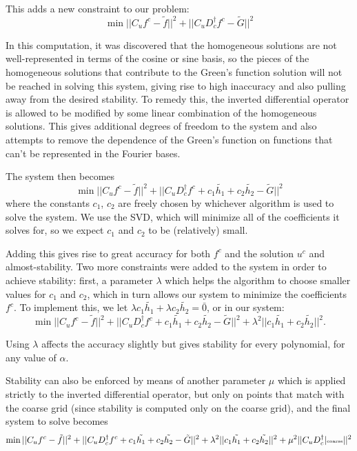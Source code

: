 \documentclass[11pt]{amsart}
\begin{document}
This adds a new constraint to our problem: 
\begin{equation}
\min ||C_u f^c - \tilde{f}|| ^2 + ||C_u D_c^{\dagger} f^c - \tilde{G}||^2
\end{equation} 

In this computation, it was discovered that the homogeneous solutions are not well-represented in terms of the cosine or sine basis, so the pieces of the homogeneous solutions that contribute to the Green's function solution will not be reached in solving this system, giving rise to high inaccuracy and also pulling away from the desired stability. To remedy this, the inverted differential operator is allowed to be modified by some linear combination of the homogeneous solutions.  This gives additional degrees of freedom to the system and also attempts to remove the dependence of the Green's function on functions that can't be represented in the Fourier bases.  

The system then becomes
\begin{equation}
\min ||C_u f^c - \tilde{f}|| ^2 + ||C_u D_c^{\dagger} f^c +c_1 \tilde{h_1} + c_2 \tilde{h_2} - \tilde{G}||^2
\end{equation}
where the constants $c_1$, $c_2$ are freely chosen by whichever algorithm is used to solve the system.  We use the SVD, which will minimize all of the coefficients it solves for, so we expect $c_1$ and $c_2$ to be (relatively) small.  


Adding this gives rise to great accuracy for both $f^c$ and the solution $u^c$ and almost-stability.  Two more constraints were added to the system in order to achieve stability: first, a parameter $\lambda$ which helps the algorithm to choose smaller values for $c_1$ and $c_2$,  which in turn allows our system to minimize the coefficients $f^c$. To implement this, we let $\lambda c_1 \tilde{h_1} + \lambda c_2 \tilde{h_2} = \bar{0}$, or in our system:
\begin{equation}
\min ||C_u f^c - \tilde{f}|| ^2 + ||C_u D_c^{\dagger} f^c +c_1\tilde{h_1}+c_2\tilde{h_2}- \tilde{G}||^2 + \lambda^2|| c_1 \tilde{h_1} + c_2 \tilde{h_2} ||^2.
\end{equation}

Using $\lambda$ affects the accuracy slightly but gives stability for every polynomial, for any value of $\alpha$.  

Stability can also be enforced by means of another parameter $\mu$ which is applied strictly to the inverted differential operator, but only on points that match with the coarse grid (since stability is computed only on the coarse grid), and the final system to solve becomes
\begin{equation}
\min ||C_u f^c - \tilde{f}|| ^2 + ||C_u D_c^{\dagger} f^c +c_1\tilde{h_1}+c_2\tilde{h_2}- \tilde{G}||^2 + \lambda^2|| c_1 \tilde{h_1} + c_2 \tilde{h_2} ||^2 + \mu^2||C_u D_c^{\dagger}|{\text{\tiny{coarse}}}  ||^2
\end{equation}
\end{document}
